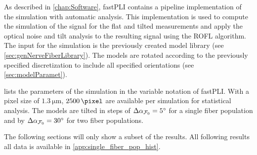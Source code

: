 %
As described in \cref{chap:Software}, \ac{fastPLI} contains a pipeline implementation of the simulation with automatic analysis.
This implementation is used to compute the simulation of the signal for the flat and tilted measurements and apply the optical noise and tilt analysis to the resulting signal using the \ac{ROFL} algorithm. 
The input for the simulation is the previously created model library (see \cref{sec:genNerveFiberLibrary}).
The models are rotated according to the previously specified discretization to include all specified orientations (see \cref{sec:modelParamet}).
\par
% 
 lists the parameters of the simulation in the variable notation of \ac{fastPLI}.
With a pixel size of $\SI{1.3}{\micro\meter}$, $\SI{2500}{\pixel}$ are available per simulation for statistical analysis.
The models are tilted in steps of $\Delta \textnormal{$\alpha_{\textnormal{$\mathcal{F}_0$}}$} = \SI{5}{\degree}$ for a single fiber population and by $\Delta \textnormal{$\alpha_{\textnormal{$\mathcal{F}_0$}}$} = \SI{30}{\degree}$ for two fiber populations.
\par
% 
The following sections will only show a subset of the results. 
All following results all data is available in \cref{app:single_fiber_pop_hist}.
% 
% 
% 
